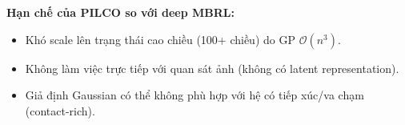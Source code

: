 \textbf{Hạn chế của PILCO so với deep MBRL:}
\begin{itemize}
    \item Khó scale lên trạng thái cao chiều (100+ chiều) do GP $\mathcal{O}(n^3)$.
    \item Không làm việc trực tiếp với quan sát ảnh (không có latent representation).
    \item Giả định Gaussian có thể không phù hợp với hệ có tiếp xúc/va chạm (contact-rich).
\end{itemize}
\medskip
